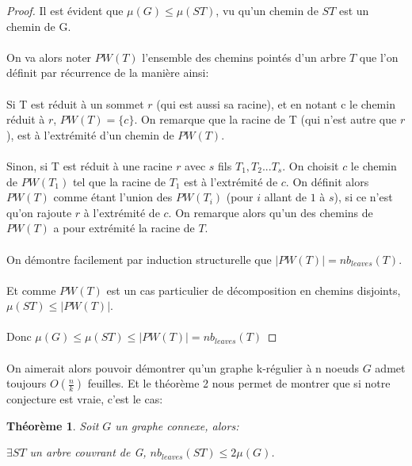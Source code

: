 \documentclass[a4paper]{article}
\newtheorem{theorem}{Théorème}
\theoremstyle{definition}
\theoremstyle{remark}
\begin{document}
\begin{proof}
Il est évident que $\mu(G) \leq \mu(ST)$, vu qu'un chemin de $ST$ est un
chemin de G.

\paragraph{}
On va alors noter $PW(T)$ l'ensemble des chemins pointés d'un arbre $T$ que l'on définit par récurrence de la manière ainsi:

\paragraph{}
Si T est réduit à un sommet $r$ (qui est aussi sa racine), et en notant c le chemin réduit à $r$, $PW(T) = \{c\}$. On remarque que la racine de T (qui n'est autre que $r$), est à l'extrémité d'un chemin de $PW(T)$.

\paragraph{}
Sinon, si T est réduit à une racine $r$ avec $s$ fils $T_{1}, T_{2} ... T_{s}$. On choisit $c$ le chemin de $PW(T_{1})$ tel que la racine de $T_{1}$ est à l'extrémité de $c$. On définit alors $PW(T)$ comme étant l'union des $PW(T_{i})$ (pour $i$ allant de $1$ à $s$), si ce n'est qu'on rajoute $r$ à l'extrémité de $c$. On remarque alors qu'un des chemins de $PW(T)$ a pour extrémité la racine de $T$.

\paragraph{}
On démontre facilement par induction structurelle que $|PW(T)|= nb_{leaves}(T)$.


\paragraph{}
Et comme $PW(T)$ est un cas particulier de décomposition en chemins disjoints, $\mu(ST) \leq |PW(T)|$.


\paragraph{}
Donc $\mu(G) \leq \mu(ST) \leq |PW(T)| = nb_{leaves}(T)$
\end{proof}


\paragraph{}
On aimerait alors pouvoir démontrer qu'un graphe k-régulier à n noeuds $G$ admet toujours $O(\frac{n}{k})$ feuilles. Et le théorème 2 nous
permet de montrer que si notre conjecture est vraie, c'est le cas:
\begin{theorem}
Soit $G$ un graphe connexe, alors:

$\exists ST$ un arbre couvrant de G, $nb_{leaves}(ST)\leq 2\mu(G)$.
\end{theorem}
\end{document}
